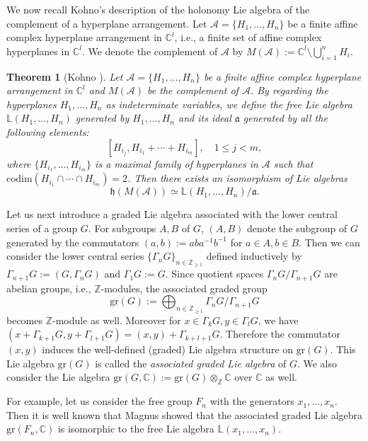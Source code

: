 \documentclass[a4paper,12pt]{article}
\newcommand{\C}{\mathbb{C}}
\newtheorem{thm}{Theorem}[section]
\theoremstyle{definition}
\theoremstyle{remark}
\begin{document}
We now recall Kohno's description of the holonomy Lie algebra of the complement of a hyperplane arrangement. 
Let $\mathcal{A}=\{H_{1},\ldots,H_{n}\}$ be a finite affine  complex hyperplane arrangement in $\C^{l}$,
i.e., a finite set of affine complex hyperplanes in $\C^{l}$.
We denote the complement of $\mathcal{A}$ by 
$M(\mathcal{A}):=\C^{l}\setminus\bigcup_{i=1}^{n}H_{i}$.
\begin{thm}[Kohno \cite{Koh83}]\label{kohnohollie}
	Let $\mathcal{A}=\{H_{1},\ldots,H_{n}\}$ be a finite affine complex hyperplane arrangement in $\C^{l}$ and $M(\mathcal{A})$ be the complement of $\mathcal{A}$.
	By regarding the hyperplanes $H_{1},\ldots,H_{n}$ as indeterminate variables,  we define
	the free Lie algebra $\mathbb{L}(H_{1},\ldots,H_{n})$ generated by $H_{1},\ldots,H_{n}$ and 
	its ideal $\mathfrak{a}$ generated by all the following elements:
	\[
		[H_{i_{j}},H_{i_{1}}+\cdots+H_{i_{m}}],\quad 1\le j<m,
	\]
	where
	$\{H_{i_{1}},\ldots,H_{i_{m}}\}$ is a maximal 
	family of hyperplanes in $\mathcal{A}$ such that
	$\mathrm{codim}(H_{i_{1}}\cap\cdots\cap H_{i_{m}})=2$.
	Then there exists an isomorphism of Lie algebras
	\[
	\mathfrak{h}(M(\mathcal{A})) \simeq \mathbb{L}(H_{1},\ldots,H_{n})/\mathfrak{a}.
	\]
\end{thm}

Let us next introduce a graded Lie algebra associated with the lower central 
series of a group $G$.
For subgroups $A, B$ of $G$, $(A,B)$ denote the subgroup of $G$
generated by the commutators $(a,b):=aba^{-1}b^{-1}$ for $a\in A, b\in B$.
Then we can consider the lower central series 
$\{\Gamma_{n}G\}_{n\in \mathbb{Z}_{\ge 1}}$ defined inductively by 
$\Gamma_{n+1}G:=(G,\Gamma_{n}G)$ and $\Gamma_{1}G:=G$.
Since quotient spaces $\Gamma_{n}G/\Gamma_{n+1}G$ are abelian 
groups, i.e., $\mathbb{Z}$-modules, the associated graded group 
\[
	\mathrm{gr}(G):=\bigoplus_{n\in \mathbb{Z}_{\ge 1}}\Gamma_{n}G/\Gamma_{n+1}G
\]
becomes $\mathbb{Z}$-module as well.
Moreover for $x\in \Gamma_{k}G, y\in \Gamma_{l}G$, 
we have $(x+\Gamma_{k+1}G, y+\Gamma_{l+1}G)
=(x,y)+\Gamma_{k+l+1}G$. Therefore the commutator $(x,y)$
induces the well-defined (graded) Lie algebra structure on $\mathrm{gr}(G)$.
This Lie algebra $\mathrm{gr}(G)$ is called the \emph{associated graded Lie algebra} of $G$.
We also consider the Lie algebra 
$\mathrm{gr}(G,\mathbb{C}):=\mathrm{gr}(G)\otimes_{\mathbb{Z}}\mathbb{C}$
over $\mathbb{C}$ as well.

For example, let us consider the free group $F_{n}$
with the generators $x_{1},\ldots,x_{n}$. Then it is well known that 
Magnus \cite{Mag37} showed that the associated graded Lie algebra $\mathrm{gr}(F_{n},\mathbb{C})$
is isomorphic to the free Lie algebra $\mathbb{L}(x_{1},\ldots,x_{n})$. 
\end{document}

